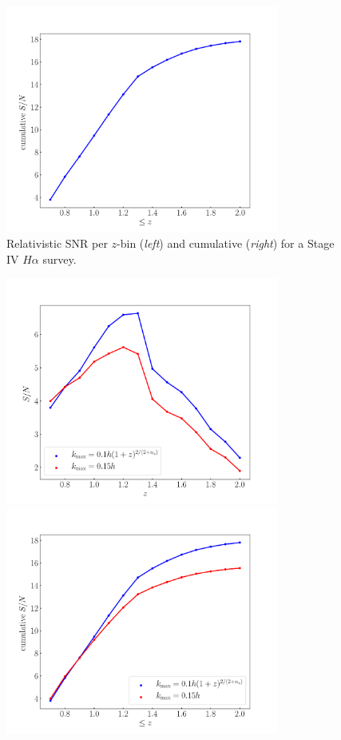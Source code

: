 \begin{itemize}
\begin{figure}[!ht]
\includegraphics[width=0.8\textwidth]{fig/CumulativesnrDoppler-eps-converted-to}
\caption{Relativistic SNR per $z$-bin  ({\em left}) and cumulative ({\em right}) for a Stage IV $H\alpha$ survey.} \label{fig4}
\end{figure}
\begin{figure}[!ht]
\centering
\includegraphics[width=0.8\textwidth]{fig/kmaxsnr-eps-converted-to}
\includegraphics[width=0.8\textwidth]{fig/kmaxcumsnr-eps-converted-to} 

\end{figure}
\end{itemize}
